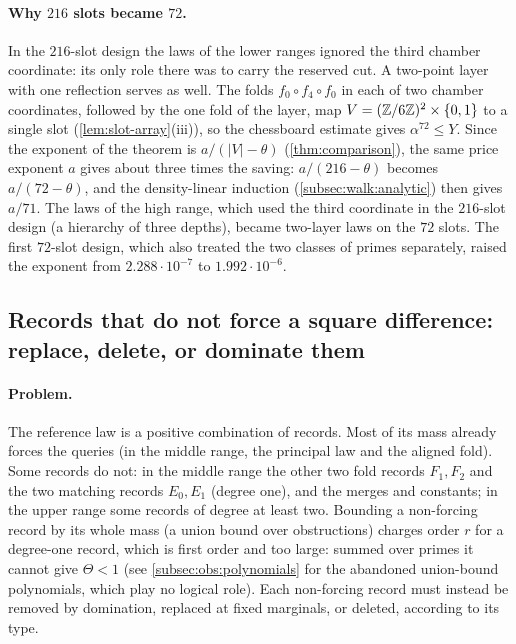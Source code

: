 \paragraph{Why $216$ slots became $72$.}
In the $216$-slot design the laws of the lower ranges ignored the third
chamber coordinate: its only role there was to carry the reserved cut. A
two-point layer with one reflection serves as well. The folds
$f_0\circ f_4\circ f_0$ in each of two chamber coordinates, followed by the one
fold of the layer, map $V=(\mathbb Z/6\mathbb Z)^2\times\{0,1\}$ to a single slot
(\cref{lem:slot-array}(iii)), so the chessboard estimate gives
$\alpha^{72}\le Y$. Since the exponent of the theorem is $a/(|V|-\theta)$
(\cref{thm:comparison}), the same price exponent $a$ gives about three times
the saving: $a/(216-\theta)$ becomes $a/(72-\theta)$, and the density-linear
induction (\cref{subsec:walk:analytic}) then gives $a/71$. The laws of the high
range, which used the third coordinate in the $216$-slot design (a hierarchy of
three depths), became two-layer laws on the $72$ slots. The first $72$-slot
design, which also treated the two classes of primes separately, raised the
exponent from $2.288\cdot10^{-7}$ to $1.992\cdot10^{-6}$.

\subsection{Records that do not force a square difference: replace, delete, or dominate them}
\label{subsec:walk:repair}

\paragraph{Problem.}
The reference law is a positive combination of records. Most of its
mass already forces the queries (in the middle range, the principal
law and the aligned fold). Some records do not: in the middle range
the other two fold records $F_1,F_2$ and the two matching records
$E_0,E_1$ (degree one), and the merges and constants; in the upper
range some records of degree at least two. Bounding a non-forcing
record by its whole mass (a union bound over obstructions) charges
order $r$ for a degree-one record, which is first order and too
large: summed over primes it cannot give $\Theta<1$ (see
\cref{subsec:obs:polynomials} for the abandoned union-bound
polynomials, which play no logical role). Each non-forcing record
must instead be removed by domination, replaced at fixed marginals,
or deleted, according to its type.

